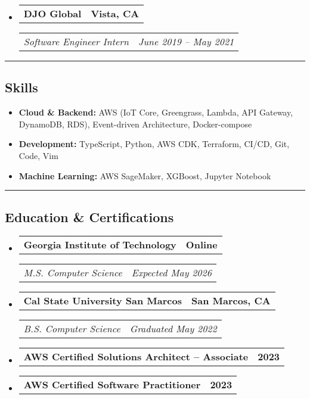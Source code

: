 \documentclass[11pt,letterpaper]{article}
\makeatletter
\newcommand{\headerrow}[2]
{\begin{tabular*}{\linewidth}{l@{\extracolsep{\fill}}r}
#1 &
#2 \\
\end{tabular*}}
\makeatother
\begin{document}
\begin{itemize}[leftmargin=1em]
    \item
        \headerrow
        {\textbf{DJO Global}}
        {\textbf{Vista, CA}}
        \headerrow
        {\emph{Software Engineer Intern}}
        {\emph{June 2019 -- May 2021}}
\end{itemize}

\hrule
\vspace{-1em}
\subsection*{\Large Skills}

\begin{itemize}[leftmargin=1em,noitemsep]
    \item \textbf{Cloud \& Backend:}
          AWS (IoT Core, Greengrass, Lambda, API Gateway, DynamoDB, RDS), Event-driven Architecture, Docker-compose
    \item \textbf{Development:}
          TypeScript, Python, AWS CDK, Terraform, CI/CD, Git, Code, Vim
    \item \textbf{Machine Learning:}
          AWS SageMaker, XGBoost, Jupyter Notebook
\end{itemize}

\hrule
\vspace{-1em}
\subsection*{\Large Education \& Certifications}

\begin{itemize}[leftmargin=1em]
    \parskip=0.1em
        
    \item
        \headerrow
        {\textbf{Georgia Institute of Technology}}
        {\textbf{Online}}
        \headerrow
        {\emph{M.S. Computer Science}}
        {\emph{Expected May 2026}}
        
    \item
        \headerrow
        {\textbf{Cal State University San Marcos}}
        {\textbf{San Marcos, CA}}
        \headerrow
        {\emph{B.S. Computer Science}}
        {\emph{Graduated May 2022}}
        
    \item
        \headerrow
        {\textbf{AWS Certified Solutions Architect -- Associate}}
        {\textbf{2023}}
        
    \item
        \headerrow
        {\textbf{AWS Certified Software Practitioner}}
        {\textbf{2023}}
\end{itemize}
\end{document}
